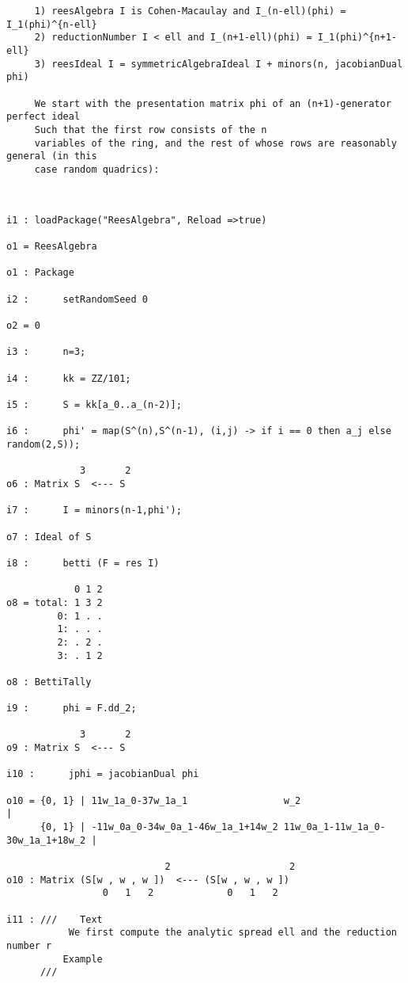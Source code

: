 \documentclass[twoside,12pt, leqno]{amsart}
\begin{document}
\begin{verbatim}
     1) reesAlgebra I is Cohen-Macaulay and I_(n-ell)(phi) = I_1(phi)^{n-ell}
     2) reductionNumber I < ell and I_(n+1-ell)(phi) = I_1(phi)^{n+1-ell}
     3) reesIdeal I = symmetricAlgebraIdeal I + minors(n, jacobianDual phi)
     
     We start with the presentation matrix phi of an (n+1)-generator perfect ideal
     Such that the first row consists of the n
     variables of the ring, and the rest of whose rows are reasonably general (in this
     case random quadrics):
     
  \end{verbatim}
   
     
     

\begin{verbatim}
 
i1 : loadPackage("ReesAlgebra", Reload =>true)

o1 = ReesAlgebra

o1 : Package

i2 :      setRandomSeed 0

o2 = 0

i3 :      n=3;

i4 :      kk = ZZ/101;

i5 :      S = kk[a_0..a_(n-2)];

i6 :      phi' = map(S^(n),S^(n-1), (i,j) -> if i == 0 then a_j else random(2,S));

             3       2
o6 : Matrix S  <--- S

i7 :      I = minors(n-1,phi');

o7 : Ideal of S

i8 :      betti (F = res I)

            0 1 2
o8 = total: 1 3 2
         0: 1 . .
         1: . . .
         2: . 2 .
         3: . 1 2

o8 : BettiTally

i9 :      phi = F.dd_2;

             3       2
o9 : Matrix S  <--- S

i10 :      jphi = jacobianDual phi

o10 = {0, 1} | 11w_1a_0-37w_1a_1                 w_2                              |
      {0, 1} | -11w_0a_0-34w_0a_1-46w_1a_1+14w_2 11w_0a_1-11w_1a_0-30w_1a_1+18w_2 |

                            2                     2
o10 : Matrix (S[w , w , w ])  <--- (S[w , w , w ])
                 0   1   2             0   1   2

i11 : ///    Text
           We first compute the analytic spread ell and the reduction number r
          Example
      ///    


\end{verbatim}
\end{document}
